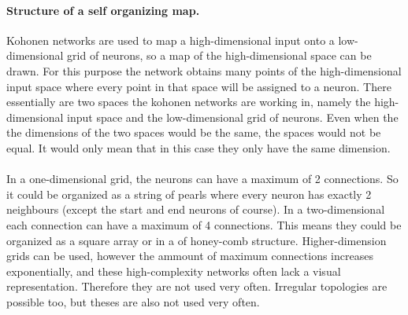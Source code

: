 \documentclass[pdftex,a4paper,12pt,twoside]{report}
\theoremstyle{plain} \newtheorem{theorem}{Theorem} \newtheorem{proposition}{Proposition} \newtheorem{lemma}{Lemma} \newtheorem*{corollary}{Corollary}
\theoremstyle{definition} \newtheorem{definition}{Definition} \newtheorem{conjecture}{Conjecture} \newtheorem*{example}{Example} \newtheorem{algorithm}{Algorithm}
\theoremstyle{remark} \newtheorem*{remark}{Remark} \newtheorem*{note}{Note} \newtheorem{case}{Case}
\begin{document}
\paragraph{Structure of a self organizing map.}
Kohonen networks are used to map a high-dimensional input onto a low-dimensional grid of neurons, so a map of the high-dimensional space can be drawn. For this purpose the network obtains many points of the high-dimensional input space where every point in that space will be assigned to a neuron. There essentially are two spaces the kohonen networks are working in, namely the high-dimensional input space and the low-dimensional grid of neurons. Even when the the dimensions of the two spaces would be the same, the spaces would not be equal. It would only mean that in this case they only have the same dimension.\\\\
In a one-dimensional grid, the neurons can have a maximum of 2 connections. So it could be organized as a string of pearls where every neuron has exactly 2 neighbours (except the start and end neurons of course). In a two-dimensional each connection can have a maximum of 4 connections. This means they could be organized as a square array or in a of honey-comb structure. Higher-dimension grids can be used, however the ammount of maximum connections increases exponentially, and these high-complexity networks often lack a visual representation. Therefore they are not used very often. Irregular topologies are possible too, but theses are also not used very often.
\end{document}
